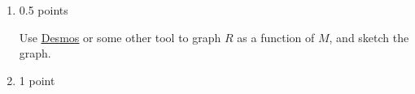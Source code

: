 \documentclass{article}
\makeatletter
\newenvironment{enumeratecols}[2][]
{\NumTabs{#2}%
  \begin{enumerate*}[%
    itemjoin={\tab},#1]}%
  {\end{enumerate*}}
\let\@href=\href
\renewcommand{\href}[2]{\@href{#1}{\ul{#2}}}
\makeatother
\begin{document}
\begin{enumerate}
\begin{enumerate}
    \begin{solution}
      \begin{align*}
        \log_{10} R &= 0.73 \log_{10} M +0.55  \\
        10^{\log_{10} R} &= 10^{0.73 \log_{10} M +0.55} \\
        R &= 10^{0.55}10^{0.73 \log_{10} M} \\
        R &= 10^{0.55} M^{0.73}
      \end{align*}
      So as a function of mass, .
    \end{solution}

  \item

    \begin{grading}
      0.5 points
    \end{grading}

    \begin{problem}[\vfill]
      Use \href{https://www.desmos.com/calculator}{Desmos} or some other tool to graph $R$ as a function of $M$, and sketch the graph. 
    \end{problem}

    \begin{solution}
      \begin{center}
      \end{center}
    \end{solution}

  \item

    \begin{grading}
      1 point
    \end{grading}

\end{enumerate}
\end{enumerate}
\end{document}
